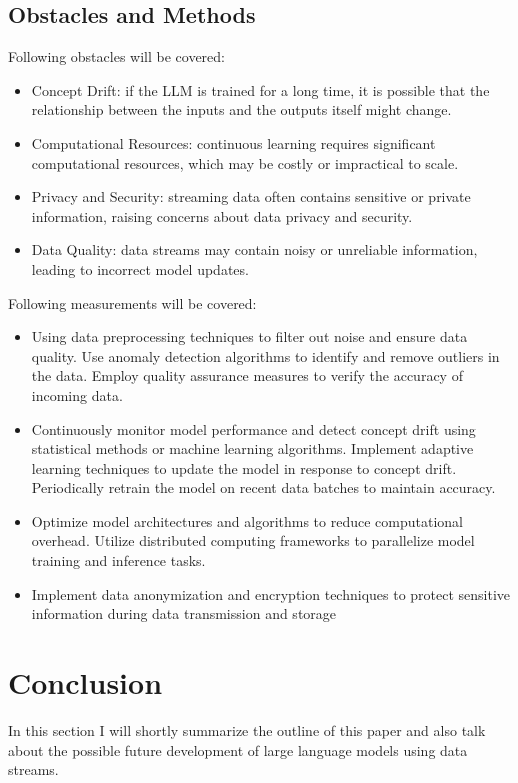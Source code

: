 \documentclass[runningheads]{llncs}
\begin{document}
\subsection{Obstacles and Methods}
Following obstacles will be covered:
\begin{itemize}
    \item Concept Drift: if the LLM is trained for a long time, it is possible that the relationship between the inputs and the outputs itself might change.
    \item Computational Resources: continuous learning requires significant computational resources, which may be costly or impractical to scale.
    \item Privacy and Security:  streaming data often contains sensitive or private information, raising concerns about data privacy and security.
    \item Data Quality: data streams may contain noisy or unreliable information, leading to incorrect model updates.
\end{itemize}
\noindent
Following measurements will be covered:
\begin{itemize}
    \item Using data preprocessing techniques to filter out noise and ensure data quality. Use anomaly detection algorithms to identify and remove outliers in the data. Employ quality assurance measures to verify the accuracy of incoming data.
    \item Continuously monitor model performance and detect concept drift using statistical methods or machine learning algorithms. Implement adaptive learning techniques to update the model in response to concept drift. Periodically retrain the model on recent data batches to maintain accuracy.
    \item Optimize model architectures and algorithms to reduce computational overhead. Utilize distributed computing frameworks to parallelize model training and inference tasks.
    \item Implement data anonymization and encryption techniques to protect sensitive information during data transmission and storage
\end{itemize}

\section{Conclusion}
In this section I will shortly summarize the outline of this paper and also talk about the possible future development of large language models using data streams.
\end{document}
